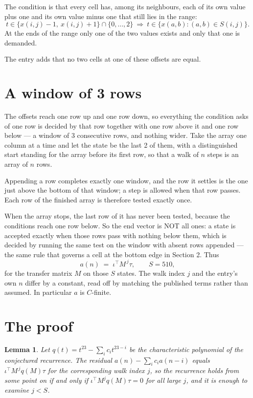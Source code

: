 \documentclass[11pt,a4paper]{article}
\theoremstyle{plain}
\newtheorem{lemma}[theorem]{Lemma}
\theoremstyle{definition}
\begin{document}
The condition is that every cell has, among its neighbours, each of its own value plus one and its own value minus one that still lies in the range:
\[
t\in\{x(i,j)-1,\ x(i,j)+1\}\cap\{0,\dots,2\}\ \Longrightarrow\ t\in\{x(a,b):(a,b)\in S(i,j)\}.
\]
At the ends of the range only one of the two values exists and only that one is demanded.

The entry adds that no two cells at one of these offsets are equal.

\section{A window of 3 rows}

The offsets reach one row up and one row down, so everything the condition asks of one row is
decided by that row together with one row above it and one row below --- a window of
$3$ consecutive rows, and nothing wider. Take the array one column at a time and
let the state be the last 2 of them, with a distinguished start standing for the array before its
first row, so that a walk of $n$ steps is an array of $n$ rows.

Appending a row completes exactly one window, and the row it settles is the one just above the bottom of that window; a step is
allowed when that row passes. Each row of the finished array is therefore tested exactly once.

When the array stops, the last row of it has never been tested, because the
conditions reach one row below. So the end vector is NOT all ones: a state is accepted exactly when
those rows pass with nothing below them, which is decided by running the same test on the window
with absent rows appended --- the same rule that governs a cell at the bottom edge in
Section 2.
Thus
\[
a(n)\;=\;\iota^{\!\top}M^{\,j}\tau ,\qquad S=510,
\]
for the transfer matrix $M$ on those $S$ states. The walk index $j$ and the entry's own $n$
differ by a constant, read off by matching the published terms rather than assumed. In
particular $a$ is $C$-finite.

\section{The proof}

\begin{lemma}\label{lem:crit}
Let $q(t)=t^{23}-\sum_i c_it^{23-i}$ be the characteristic polynomial of the
conjectured recurrence. The residual $a(n)-\sum_ic_ia(n-i)$ equals
$\iota^{\!\top}M^{\,j}q(M)\tau$ for the corresponding walk index $j$, so the recurrence
holds from some point on if and only if $\iota^{\!\top}M^{j}q(M)\tau=0$ for all large $j$,
and it is enough to examine $j<S$.
\end{lemma}
\end{document}
